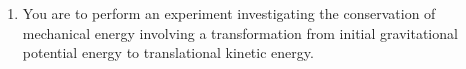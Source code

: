 {\begin{enumerate}
  \item You are to perform an experiment investigating the conservation of
  mechanical energy involving a transformation from initial gravitational
  potential energy to translational kinetic energy.
%
%
%    

\end{enumerate}}
